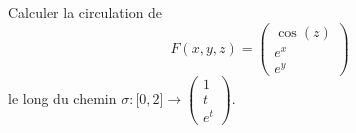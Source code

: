 
\begin{exercice}\label{exoOutilsMath-0063}

    Calculer la circulation de
    \begin{equation}
        F(x,y,z)=\begin{pmatrix}
            \cos(z)    \\ 
            e^x    \\ 
            e^y    
        \end{pmatrix}
    \end{equation}
    le long du chemin $\sigma\colon \mathopen[ 0 , 2 \mathclose]\to \begin{pmatrix}
        1    \\ 
        t    \\ 
        e^{t}    
    \end{pmatrix}$.

\end{exercice}
